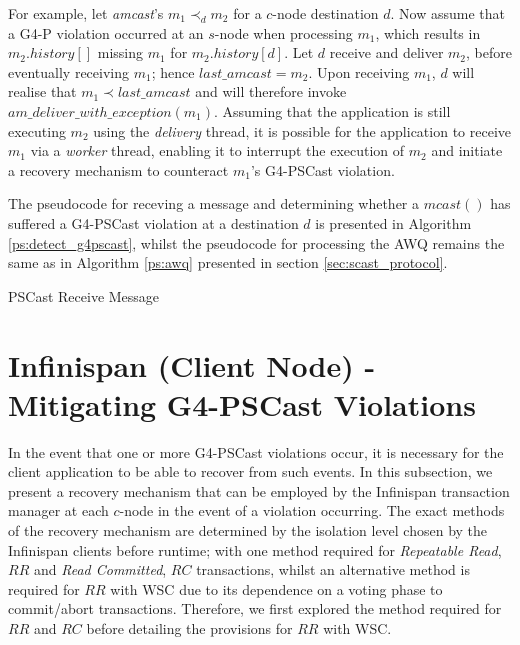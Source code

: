 For example, let \emph{amcast}'s $m_1 \prec_d m_2$ for a $c$-node destination $d$.  Now assume that a G4-P violation occurred at an $s$-node when processing $m_1$, which results in $m_2.history[]$ missing $m_1$ for $m_2.history[d]$.  Let $d$ receive and deliver $m_2$, before eventually receiving $m_1$; hence $last\_amcast = m_2$.  Upon receiving $m_1$, $d$ will realise that $m_1 \prec last\_amcast$ and will therefore invoke $am\_deliver\_with\_exception(m_1)$.  Assuming that the application is still executing $m_2$ using the \emph{delivery} thread, it is possible for the application to receive $m_1$ via a \emph{worker} thread, enabling it to interrupt the execution of $m_2$ and initiate a recovery mechanism to counteract $m_1$'s G4-PSCast violation.  

The pseudocode for receving a message and determining whether a $mcast()$ has suffered a G4-PSCast violation at a destination $d$ is presented in Algorithm \ref{ps:detect_g4pscast}, whilst the pseudocode for processing the AWQ remains the same as in Algorithm \ref{ps:awq} presented in section \ref{sec:scast_protocol}.  

    \begin{algorithm}[H]
       \caption{PSCast Receive Message}
        \label{ps:detect_g4pscast}
        \begin{algorithmic}[1]
		         \ENDIF
		     \ELSE
		     \ENDIF
        \end{algorithmic}
    \end{algorithm}   

\section{Infinispan (Client Node) - Mitigating G4-PSCast Violations}
    In the event that one or more G4-PSCast violations occur, it is necessary for the client application to be able to recover from such events.  In this subsection, we present a recovery mechanism that can be employed by the Infinispan transaction manager at each $c$-node in the event of a violation occurring.  The exact methods of the recovery mechanism are determined by the isolation level chosen by the Infinispan clients before runtime; with one method required for \emph{Repeatable Read}, $RR$ and \emph{Read Committed}, $RC$ transactions, whilst an alternative method is required for $RR$ with WSC due to its dependence on a voting phase to commit/abort transactions.  Therefore, we first explored the method required for $RR$ and $RC$ before detailing the provisions for $RR$ with WSC.  
    
